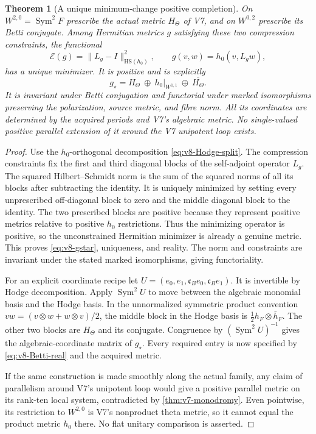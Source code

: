 \documentclass[11pt]{article}
\newtheorem{theorem}{Theorem}[section]
\theoremstyle{definition}
\theoremstyle{remark}
\begin{document}
\begin{theorem}[A unique minimum-change positive completion]
\label{thm:v8-extension}
On $W^{2,0}=\operatorname{Sym}^2F$ prescribe the actual metric $H_\Theta$
of V7, and on $W^{0,2}$ prescribe its Betti conjugate. Among Hermitian
metrics $g$ satisfying these two compression constraints, the functional
\begin{equation}
 \mathcal E(g)=\|L_g-I\|_{\mathrm{HS}(h_0)}^2,
 \qquad g(v,w)=h_0(v,L_gw),
 \label{eq:v8-minchange}
\end{equation}
has a unique minimizer. It is positive and is explicitly
\begin{equation}
 \boxed{g_\star=H_\Theta\ \oplus\ h_0|_{W^{1,1}}\ \oplus\
                  \overline{H_\Theta}.}
 \label{eq:v8-gstar}
\end{equation}
It is invariant under Betti conjugation and functorial under marked
isomorphisms preserving the polarization, source metric, and fibre norm.
All its coordinates are determined by the acquired periods and V7's
algebraic metric. No single-valued positive parallel extension of it
around the V7 unipotent loop exists.
\end{theorem}
\begin{proof}
Use the $h_0$-orthogonal decomposition \eqref{eq:v8-Hodge-split}. The
compression constraints fix the first and third diagonal blocks of the
self-adjoint operator $L_g$. The squared Hilbert--Schmidt norm is the sum
of the squared norms of all its blocks after subtracting the identity.
It is uniquely minimized by setting every unprescribed off-diagonal block
to zero and the middle diagonal block to the identity. The two prescribed
blocks are positive because they represent positive metrics relative to
positive $h_0$ restrictions. Thus the minimizing operator is positive,
so the unconstrained Hermitian minimizer is already a genuine metric.
This proves \eqref{eq:v8-gstar}, uniqueness, and reality. The norm and
constraints are invariant under the stated marked isomorphisms, giving
functoriality.

For an explicit coordinate recipe let
$U=(e_0,e_1,\mathfrak c_Be_0,\mathfrak c_Be_1)$. It is invertible by
Hodge decomposition. Apply $\operatorname{Sym}^2U$ to move between the
algebraic monomial basis and the Hodge basis. In the unnormalized symmetric
product convention $vw=(v\otimes w+w\otimes v)/2$, the middle block in
the Hodge basis is $\tfrac12h_F\otimes\bar h_F$. The other two blocks
are $H_\Theta$ and its conjugate. Congruence by
$(\operatorname{Sym}^2U)^{-1}$ gives the algebraic-coordinate matrix of
$g_\star$. Every required entry is now specified by \eqref{eq:v8-Betti-real}
and the acquired metric.

If the same construction is made smoothly along the actual family, any
claim of parallelism around V7's unipotent loop would give a positive
parallel metric on its rank-ten local system, contradicted by
\cref{thm:v7-monodromy}. Even pointwise, its restriction to $W^{2,0}$ is
V7's nonproduct theta metric, so it cannot equal the product metric $h_0$
there. No flat unitary comparison is asserted.
\end{proof}
\end{document}
